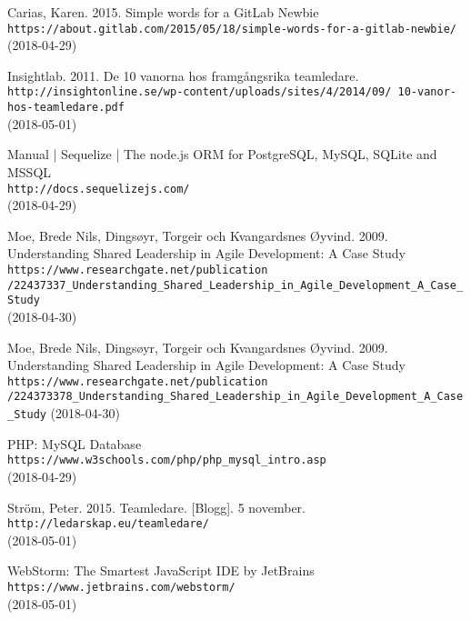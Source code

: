 \begin{thebibliography}{99}

Carias, Karen. 2015. Simple words for a GitLab Newbie
\\\texttt{https://about.gitlab.com/2015/05/18/simple-words-for-a-gitlab-newbie/}\\
(2018-04-29)

Insightlab. 2011. De 10 vanorna hos framgångsrika teamledare.\\\texttt{http://insightonline.se/wp-content/uploads/sites/4/2014/09/
10-vanor-hos-teamledare.pdf}\\
(2018-05-01)


Manual | Sequelize | The node.js ORM for PostgreSQL, MySQL, SQLite and MSSQL \\\texttt{http://docs.sequelizejs.com/}\\
(2018-04-29)

Moe, Brede Nils, Dingsøyr, Torgeir och Kvangardsnes Øyvind. 2009. Understanding Shared Leadership in Agile Development: A Case Study
\\\texttt{https://www.researchgate.net/publication\\/22437337\8_Understanding\_Shared\_Leadership\_in\_Agile\_Development\_A\_Case\_Study}
\\(2018-04-30)

Moe, Brede Nils, Dingsøyr, Torgeir och Kvangardsnes Øyvind. 2009. Understanding Shared Leadership in Agile Development: A Case Study
\texttt{https://www.researchgate.net/publication
/224373378\_Understanding\_Shared\_Leadership\_in\_Agile\_Development\_A\_Case\_Study}
(2018-04-30)


PHP: MySQL Database \\\texttt{https://www.w3schools.com/php/php_mysql_intro.asp} \\
(2018-04-29)

Ström, Peter. 2015. Teamledare. [Blogg]. 5 november. \\\texttt{http://ledarskap.eu/teamledare/} \\
(2018-05-01)

WebStorm: The Smartest JavaScript IDE by JetBrains \\\texttt{https://www.jetbrains.com/webstorm/}\\
(2018-05-01)

\end{thebibliography}